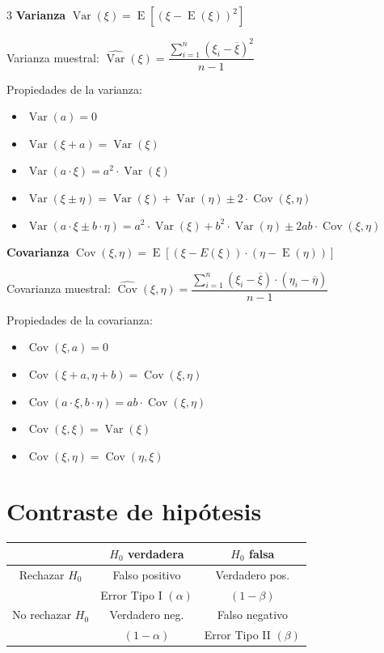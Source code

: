 \documentclass[10pt, a4paper, landscape]{article}
\DeclareMathOperator{\E}{E}
\DeclareMathOperator{\Var}{Var}
\DeclareMathOperator{\Cov}{Cov}
\begin{document}
\begin{multicols}{3}
\textbf{Varianza} \quad \( \Var(\xi) = \E \left[ (\xi - \E(\xi))^{2} \right] \)

Varianza muestral: \quad \( \widehat{\Var}(\xi) = \dfrac{\sum_{i = 1}^{n} (\xi_{i} - \overline{\xi})^2}{n - 1} \)

Propiedades de la varianza:

\begin{itemize}[leftmargin=*]
	\item \( \Var(a) = 0 \)
	\item \( \Var(\xi + a) = \Var(\xi) \)
	\item \( \Var(a \cdot \xi) = a^{2} \cdot \Var(\xi) \)
	\item \( \Var(\xi \pm \eta) = \Var(\xi) + \Var(\eta) \pm 2 \cdot \Cov(\xi, \eta) \)
	\item \( \Var(a \cdot \xi \pm b \cdot \eta) = a^{2} \cdot \Var(\xi) + b^{2} \cdot \Var(\eta) \pm 2 a b \cdot \Cov(\xi, \eta) \)
\end{itemize}

\textbf{Covarianza} \quad \( \Cov(\xi, \eta) = \E \left[ (\xi - E(\xi)) \cdot (\eta - \E(\eta)) \right] \)

Covarianza muestral: \quad \( \widehat{\Cov}(\xi, \eta) = \dfrac{\sum_{i = 1}^{n} (\xi_{i} - \overline{\xi}) \cdot (\eta_{i} - \overline{\eta})}{n - 1} \)

Propiedades de la covarianza:

\begin{itemize}[leftmargin=*]
	\item \( \Cov(\xi, a) = 0 \)
	\item \( \Cov(\xi + a, \eta + b) = \Cov(\xi, \eta) \)
	\item \( \Cov(a \cdot \xi, b \cdot \eta) = a b \cdot \Cov(\xi, \eta) \)
	\item \( \Cov(\xi, \xi) = \Var(\xi) \)
	\item \( \Cov(\xi, \eta) = \Cov(\eta, \xi) \)
\end{itemize}

\columnbreak

\section*{Contraste de hipótesis}

\begin{center}
	\begin{tabular}{ c | c | c }
		                        & \( H_{0} \) verdadera       & \( H_{0} \) falsa           \\ \hline
		Rechazar \( H_{0} \)    & Falso positivo              & Verdadero pos.              \\
		                        & Error Tipo I \( (\alpha) \) & \( (1 - \beta) \)           \\ \hline
		No rechazar \( H_{0} \) & Verdadero neg.              & Falso negativo              \\
		                        & \( (1 - \alpha) \)          & Error Tipo II \( (\beta) \)
	\end{tabular}
\end{center}


\end{multicols}
\end{document}
